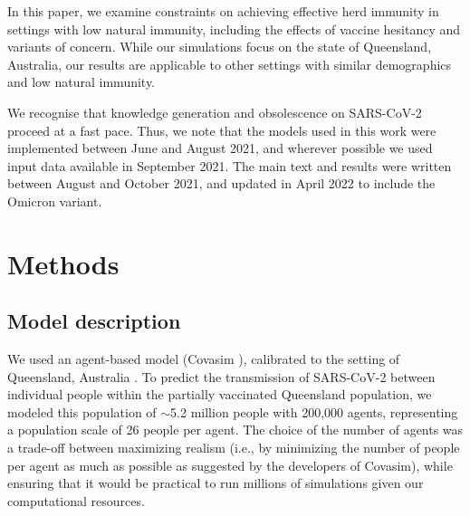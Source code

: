 \documentclass[article, a4, authoryear]{elsarticle}
\begin{document}
In this paper, we examine constraints on achieving effective herd immunity in settings with low natural immunity, including the effects of vaccine hesitancy and variants of concern. While our simulations focus on the state of Queensland, Australia, our results are applicable to other settings with similar demographics and low natural immunity. 

We recognise that knowledge generation and obsolescence on 
SARS-CoV-2 proceed at a fast pace. Thus, we note that the models used in this work were implemented between June and August 2021, and wherever possible we used input data available in September 2021. The main text and results were written between August and October 2021, and updated in April 2022 to include the Omicron variant. 


\section{Methods}
\label{sec:methods}

\subsection{Model description}
\label{subsec:covasim}
We used an agent-based model (Covasim \cite{kerr2020covasim,cohen2021mechanistic}), calibrated to the setting of Queensland, Australia \cite{sanz-leon2021qldmodel}. To predict the transmission of SARS-CoV-2 between individual people within the partially vaccinated Queensland population, we modeled this population of $\sim$5.2 million people with 200,000 agents, representing a population scale of 26 people per agent. The choice of the number of agents was a trade-off between maximizing realism (i.e., by minimizing the number of people per agent as much as possible as suggested by the developers of Covasim), while ensuring that it would be practical to run millions of simulations given our computational resources.
\end{document}

